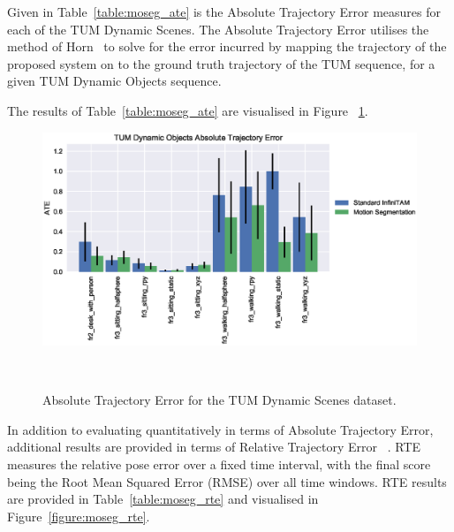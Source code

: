 Given in Table~\ref{table:moseg_ate} is the Absolute Trajectory Error measures
for each of the TUM Dynamic Scenes. The Absolute Trajectory Error utilises the
method of Horn~\cite{Horn1987} to solve for the error incurred by mapping the
trajectory of the proposed system on to the ground truth trajectory of the TUM
sequence, for a given TUM Dynamic Objects sequence.

The results of Table~\ref{table:moseg_ate} are visualised in Figure
~\ref{figure:moseg_ate}.

\begin{figure}[!htbp]
  \centering
  \includegraphics[width=0.95\linewidth]{figures/moseg/ate.eps}
  \caption[Motion Segmentation ATE]
  {Absolute Trajectory Error for the TUM Dynamic Scenes dataset.}
~\label{figure:moseg_ate}
\end{figure}

In addition to evaluating quantitatively in terms of Absolute Trajectory Error,
additional results are provided in terms of Relative Trajectory Error
~\cite{Sturm2012}. RTE measures the relative pose error over a fixed time
interval, with the final score being the Root Mean Squared Error (RMSE) over all 
time windows. RTE results are provided in Table~\ref{table:moseg_rte} and visualised 
in Figure~\ref{figure:moseg_rte}.

